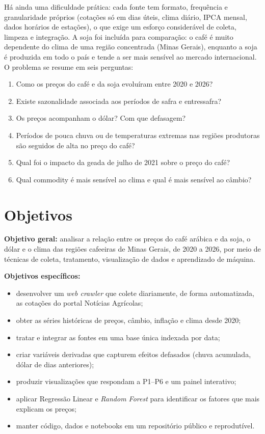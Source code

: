 \documentclass[conference]{IEEEtran}
\begin{document}
Há ainda uma dificuldade prática: cada fonte tem formato, frequência e granularidade próprios (cotações
só em dias úteis, clima diário, IPCA mensal, dados horários de estações), o que exige um esforço
considerável de coleta, limpeza e integração. A soja foi incluída para comparação: o café é muito
dependente do clima de uma região concentrada (Minas Gerais), enquanto a soja é produzida em todo o
país e tende a ser mais sensível ao mercado internacional. O problema se resume em seis perguntas:

\begin{enumerate}
  \item[P1.] Como os preços do café e da soja evoluíram entre 2020 e 2026?
  \item[P2.] Existe sazonalidade associada aos períodos de safra e entressafra?
  \item[P3.] Os preços acompanham o dólar? Com que defasagem?
  \item[P4.] Períodos de pouca chuva ou de temperaturas extremas nas regiões produtoras são seguidos
  de alta no preço do café?
  \item[P5.] Qual foi o impacto da geada de julho de 2021 sobre o preço do café?
  \item[P6.] Qual commodity é mais sensível ao clima e qual é mais sensível ao câmbio?
\end{enumerate}

\section{Objetivos}

\textbf{Objetivo geral:} analisar a relação entre os preços do café arábica e da soja, o dólar e o clima
das regiões cafeeiras de Minas Gerais, de 2020 a 2026, por meio de técnicas de coleta, tratamento,
visualização de dados e aprendizado de máquina.

\textbf{Objetivos específicos:}
\begin{itemize}
  \item desenvolver um \emph{web crawler} que colete diariamente, de forma automatizada, as cotações
  do portal Notícias Agrícolas;
  \item obter as séries históricas de preços, câmbio, inflação e clima desde 2020;
  \item tratar e integrar as fontes em uma base única indexada por data;
  \item criar variáveis derivadas que capturem efeitos defasados (chuva acumulada, dólar de dias anteriores);
  \item produzir visualizações que respondam a P1--P6 e um painel interativo;
  \item aplicar Regressão Linear e \emph{Random Forest} para identificar os fatores que mais explicam os preços;
  \item manter código, dados e notebooks em um repositório público e reprodutível.
\end{itemize}
\end{document}
